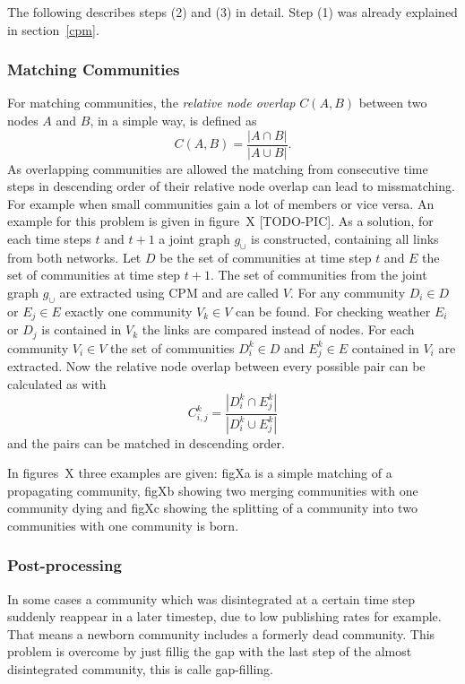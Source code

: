 \documentclass[runningheads,a4paper]{llncs}
\begin{document}
The following describes steps (2) and (3) in detail.
Step (1) was already explained in section~\ref{cpm}.

\subsubsection{Matching Communities}
\label{evolution-algo-matching}
For matching communities, the \emph{relative node overlap} $C(A,B)$ between two nodes $A$ and $B$, in a simple way, is defined as
$$C(A,B) = \frac{ \left| A \cap B\right| }{\left| A \cup B\right|}.$$
As overlapping communities are allowed the matching from consecutive time steps in descending order of their relative node overlap can lead to missmatching.
For example when small communities gain a lot of members or vice versa. An example for this problem is given in figure~X [TODO-PIC].
As a solution, for each time steps $t$ and $t+1$ a joint graph $g_{\cup}$ is constructed, containing all links from both networks.
Let $D$ be the set of communities at time step $t$ and $E$ the set of communities at time step $t+1$. The set of communities from the joint graph $g_{\cup}$ are extracted using CPM and are called $V$.
For any community $D_i \in D$ or $E_j \in E$ exactly one community $V_k \in V$ can be found.
For checking weather $E_i$ or $D_j$ is contained in $V_k$ the links are compared instead of nodes.
For each community $V_i \in V$ the set of communities $D_i^k \in D$ and $E_j^k \in E$ contained in $V_i$ are extracted.
Now the relative node overlap between every possible pair can be calculated as with
$$C^k_{i,j} = \frac{\left| D_i^k \cap E_j^k\right|}{\left| D_i^k\cup E_j^k \right| }$$
and the pairs can be matched in descending order.

In figures~X three examples are given: figXa is a simple matching of a propagating community, figXb showing two merging communities with one community dying and figXc showing the splitting of a community into two communities with one community is born.

\subsubsection{Post-processing}
In some cases a community which was disintegrated at a certain time step suddenly reappear in a later timestep, due to low publishing rates for example.
That means a newborn community includes a formerly dead community.
This problem is overcome by just fillig the gap with the last step of the almost disintegrated community, this is calle gap-filling.
\end{document}
